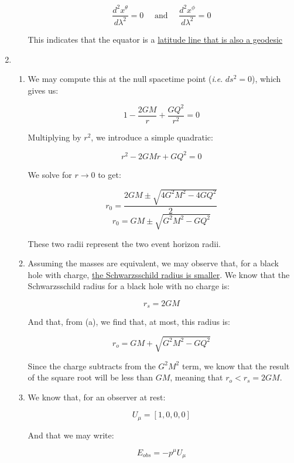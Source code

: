 \begin{enumerate}
\begin{enumerate}
        $$\boxed{\frac{d^2x^{\theta}}{d\lambda^2}=0\quad\text{ and }\quad\frac{d^2x^{\phi}}{d\lambda^2}=0}$$

        This indicates that the equator is a \underline{latitude line that is also a geodesic}

    \end{enumerate}

  \item

    \begin{enumerate}

      \item 

        We may compute this at the null spacetime point (\textit{i}.\textit{e}. $ds^2=0$), which gives us:

        $$1-\frac{2GM}{r}+\frac{GQ^2}{r^2}=0$$

        Multiplying by $r^2$, we introduce a simple quadratic:

        $$r^2-2GMr+GQ^2=0$$

        We solve for $r\to 0$ to get:

        $$r_0=\frac{2GM\pm\sqrt{4G^2M^2-4GQ^2}}{2}$$
        $$\boxed{r_0=GM\pm\sqrt{G^2M^2-GQ^2}}$$

        These two radii represent the two event horizon radii.

      \item 

        Assuming the masses are equivalent, we may observe that, for a black hole with charge, \underline{the Schwarzsschild radius is smaller}. We know that the Schwarzsschild radius for a black hole with no charge is:

        $$r_s=2GM$$

        And that, from (a), we find that, at most, this radius is:

        $$r_o=GM+\sqrt{G^2M^2-GQ^2}$$

        Since the charge subtracts from the $G^2M^2$ term, we know that the result of the square root will be less than $GM$, meaning that $r_o<r_s=2GM$.

      \item 

        We know that, for an observer at rest:

        $$U_{\mu}=[1,0,0,0]$$

        And that we may write:

        $$E_{obs}=-p^{\mu}U_{\mu}$$


\end{enumerate}
\end{enumerate}
